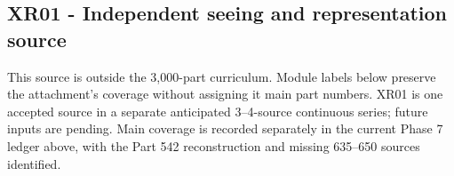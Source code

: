 \subsection{XR01 - Independent seeing and representation source}\label{appendix-fd090d982a15-xr01---independent-seeing-and-representation-source}

\hypertarget{appendix-fd090d982a15-xr01---independent-seeing-and-representation-source}{}

This source is outside the 3,000-part curriculum. Module labels below preserve the attachment's coverage without assigning it main part numbers. XR01 is one accepted source in a separate anticipated 3--4-source continuous series; future inputs are pending. Main coverage is recorded separately in the current Phase 7 ledger above, with the Part 542 reconstruction and missing 635--650 sources identified.

